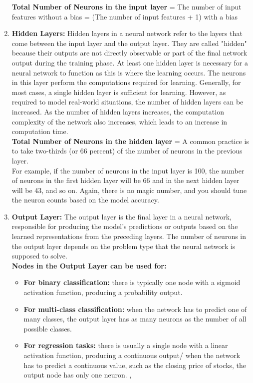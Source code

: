 \begin{enumerate}
    \textbf{Total Number of Neurons in the input layer} = The number of input features without a bias = (The number of input features + 1) with a bias 
    \cite{ansari2020building}\\
    \item \textbf{Hidden Layers: } Hidden layers in a neural network refer to the layers that come between the input layer and the output layer. They are called "hidden" because their outputs are not directly observable or part of the final network output during the training phase. At least one hidden layer is necessary for a neural network to function as this is where the learning occurs. The neurons in this layer perform the computations required for learning. Generally, for most cases, a single hidden layer is sufficient for learning. However, as required to model real-world situations, the number of hidden layers can be increased. As the number of hidden layers increases, the computation complexity of the network also increases, which leads to an increase in computation time.
    \\
    
    \textbf{Total Number of Neurons in the hidden layer} = A common practice is to take two-thirds (or 66 percent) of the number of neurons in the previous layer.\\
    
    For example, if the number of neurons in the input layer is 100, the number of neurons in the first hidden layer will be 66 and in the next hidden layer will be 43, and so on. Again, there is no magic number, and you should tune the neuron counts based on the model accuracy.
    \item \textbf{Output Layer: } The output layer is the final layer in a neural network, responsible for producing the model's predictions or outputs based on the learned representations from the preceding layers. The number of neurons in the output layer depends on the problem type that the neural network is supposed to solve. \\
    \textbf{Nodes in the Output Layer can be used for:}
    \begin{itemize}
        \item \textbf{For binary classification: } there is typically one node with a sigmoid activation function, producing a probability output.\\
        \item \textbf{For multi-class classification: } when the network has to predict one of many classes, the output layer has as many neurons as the number of all possible classes.\\
        \item \textbf{For regression tasks: } there is usually a single node with a linear activation function, producing a continuous output/ when the network has to predict a continuous value, such as the closing price of stocks, the output node has only one neuron. \cite{calin2020deep}, \cite{nielsen2015neural}
    \end{itemize}
\end{enumerate}
